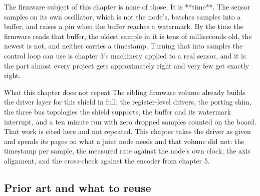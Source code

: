 The firmware subject of this chapter is none of those. It is **time**. The
sensor samples on its own oscillator, which is not the node's, batches samples
into a buffer, and raises a pin when the buffer reaches a watermark. By the time
the firmware reads that buffer, the oldest sample in it is tens of milliseconds
old, the newest is not, and neither carries a timestamp. Turning that into
samples the control loop can use is chapter 3's machinery applied to a real
sensor, and it is the part almost every project gets approximately right and
very few get exactly right.

\begin{note}{What this chapter does not repeat}
The sibling firmware volume already builds the driver layer for this shield in
full: the register-level drivers, the porting shim, the three bus topologies the
shield supports, the buffer and its watermark interrupt, and a ten minute run
with zero dropped samples counted on the board. That work is cited here and not
repeated. This chapter takes the driver as given and spends its pages on what a
joint node needs and that volume did not: the timestamp per sample, the measured
rate against the node's own clock, the axis alignment, and the cross-check
against the encoder from chapter 5.
\end{note}

\subsection*{Prior art and what to reuse}

